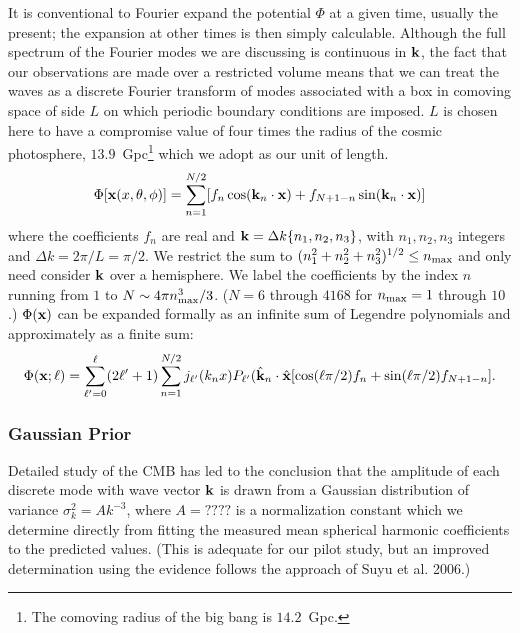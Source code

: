 \documentclass[psfig,11pt]{article}
\begin{document}
It is conventional to Fourier expand the potential $\Phi$ at a given time, usually the present; the expansion at other times is then simply calculable. Although the full spectrum of the Fourier modes we are discussing is continuous in ${\bf k}$, the fact that our observations are made over a restricted volume means that we can treat the waves as a discrete Fourier transform of modes associated with a box in comoving space of side $L$ on which periodic boundary conditions are imposed. $L$ is chosen here to have a compromise value of four times the radius of the cosmic photosphere, $13.9$~Gpc\footnote{The comoving radius of the big bang is $14.2$~Gpc.} which we adopt as our unit of length.
\begin{equation}
\Phi[{\bf x}(x,\theta,\phi)]=\sum_{n=1}^{N/2}[f_n\cos({\bf k}_n\cdot{\bf x})+f_{N+1-n}\sin({\bf k}_n\cdot{\bf x})]
\end{equation}
where the coefficients $f_n$ are real and ${\bf k}=\Delta k\{n_1,n_2,n_3\}$, with $n_1,n_2,n_3$ integers and $\Delta k=2\pi/L=\pi/2$.  We restrict the sum to $(n_1^2+n_2^2+n_3^2)^{1/2}\le n_{\rm max}$ and only need consider $\bf k$ over a hemisphere. We label the coefficients by the index $n$ running from $1$ to $N\sim4\pi n_{\rm max}^3/3$. ($N=6$ through $4168$ for $n_{\rm max}=1$ through $10$.) $\Phi({\bf x})$ can be expanded formally as an infinite sum of Legendre polynomials and approximately as a finite sum:
\begin{equation}
\Phi({\bf x;\ell})=\sum_{\ell'=0} ^\ell(2\ell'+1)\sum_{n=1}^{N/2}j_{\ell'}(k_nx)P_{\ell'}({\hat{\bf k}}_n\cdot{\hat{\bf x}}[\cos(\ell\pi/2)f_n+\sin(\ell\pi/2)f_{N+1-n}].
\end{equation}

\subsubsection{Gaussian Prior}

Detailed study of the CMB has led to the conclusion that the amplitude of each discrete mode with wave vector $\bf k$ is drawn from a Gaussian distribution of variance $\sigma_k^2=Ak^{-3}$, where $A=????$ is a normalization constant which we determine directly from fitting the measured mean spherical harmonic coefficients to the predicted values. (This is adequate for our pilot study, but an improved determination using the evidence follows the approach of Suyu et al. 2006.)
\end{document}
